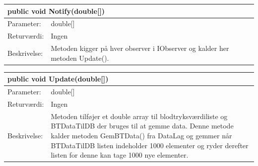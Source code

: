 \begin{table}[H]
\label{tab:tabel2}
\begin{tabular}{| l | p{13cm} |}
   \hline
   \multicolumn{2}{|l|}{public void Notify(double[])} \\ \hline
   Parameter: & double[] \\ \hline
   Returværdi: & Ingen\\ \hline
   Beskrivelse: & Metoden kigger på hver observer i IObserver og kalder her metoden Update().\\ \hline
\end{tabular}
\end{table}
\begin{table}[H]
\label{tab:tabel2}
\begin{tabular}{| l | p{13cm} |}
   \hline
   \multicolumn{2}{|l|}{public void Update(double[])} \\ \hline
   Parameter: & double[] \\ \hline
   Returværdi: & Ingen\\ \hline
   Beskrivelse: & Metoden tilføjer et double array til blodtryksværdiliste og BTDataTilDB der bruges til at gemme data. Denne metode kalder metoden GemBTData() fra DataLag og gemmer når BTDataTilDB listen indeholder 1000 elementer og ryder derefter listen for denne kan tage 1000 nye elementer. \\ \hline
\end{tabular}
\end{table}

